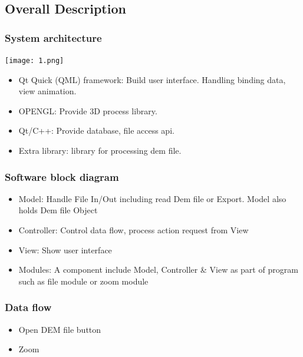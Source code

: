 \documentclass[11pt]{article}
\begin{document}
\subsection{Overall Description}
\subsubsection{System architecture}
\texttt{[image: 1.png]}
\begin{itemize}
\item Qt Quick (QML) framework: Build user interface. Handling binding data, view animation.
\item OPENGL: Provide 3D process library.
\item Qt/C++: Provide database, file access api.
\item Extra library: library for processing dem file.
\end{itemize}

\subsubsection{Software block diagram}
\noindent{}
\begin{itemize}
\item Model: Handle File In/Out including read Dem file or Export. Model also holds Dem file Object
\item Controller: Control data flow, process action request from View
\item View: Show user interface
\item Modules: A component include Model, Controller \& View as part of program such as file module or zoom module
\end{itemize}

\subsubsection{Data flow}
\begin{itemize}
\item Open DEM file button
\par\noindent{}
\item Zoom
\par\noindent{}
\end{itemize}
\end{document}

